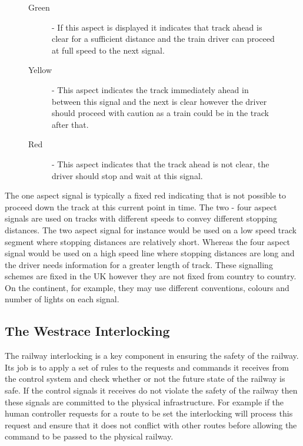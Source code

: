 \begin{figure}[h!]
\begin{description}

\item[Green] - If this aspect is displayed it indicates that track ahead is
  clear for a sufficient distance and the train driver
  can proceed at full speed to the next signal.

\item[Yellow] - This aspect indicates the track immediately ahead in between
  this signal and the next is clear however the driver should proceed with
  caution as a train could be in the track after that.

\item[Red] - This aspect indicates that the track ahead is not clear, the
  driver should stop and wait at this signal.

\end{description}
\label{fig:3lightsignal}


\end{figure}

The one aspect signal is typically a fixed red indicating that is not possible
to proceed down the track at this current point in time. The two - four aspect
signals are used on tracks with different speeds to convey different stopping
distances.  The two aspect signal for instance would be used on a low speed
track segment where stopping distances are relatively short. Whereas the four
aspect signal would be used on a high speed line where stopping distances are
long and the driver needs information for a greater length of track. These
signalling schemes are fixed in the UK however they are not fixed from country
to country. On the continent, for example, they may use different conventions,
colours and number of lights on each signal.




\subsection{The Westrace Interlocking}

The railway interlocking is a key component in ensuring the safety of the
railway. Its job is to apply a set of rules to the requests and commands it receives from the
control system and check whether or not the future state of the railway is safe.
If the control signals it receives do not violate the safety of the railway
then these signals are committed to the physical infrastructure. For example if
the human controller requests for a route to be set the interlocking will
process this request and ensure that it does not conflict with other routes
before allowing the command to be passed to the physical railway.

